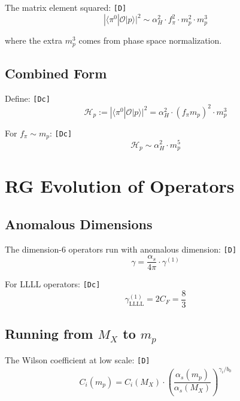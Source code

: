 \documentclass[11pt,a4paper]{article}
\newcommand{\tagD}{\textcolor{green!50!black}{\texttt{[D]}}}
\newcommand{\tagDc}{\textcolor{blue!70!black}{\texttt{[Dc]}}}
\theoremstyle{definition}
\begin{document}
The matrix element squared: \tagD{}
\begin{equation}
\label{eq:me-squared}
|\langle \pi^0 | \mathcal{O} | p \rangle|^2 \sim \alpha_H^2 \cdot f_\pi^2 \cdot m_p^2 \cdot m_p^3
\end{equation}

where the extra $m_p^3$ comes from phase space normalization.

\subsection{Combined Form}
\label{app:combined-hadronic}

Define: \tagDc{}
\begin{equation}
\label{eq:hp-combined}
\mathcal{H}_p := |\langle \pi^0 | \mathcal{O} | p \rangle|^2 = \alpha_H^2 \cdot (f_\pi m_p)^2 \cdot m_p^3
\end{equation}

For $f_\pi \sim m_p$: \tagDc{}
\begin{equation}
\label{eq:hp-scaling}
\mathcal{H}_p \sim \alpha_H^2 \cdot m_p^5
\end{equation}

\section{RG Evolution of Operators}
\label{app:rg}

\subsection{Anomalous Dimensions}
\label{app:anomalous}

The dimension-6 operators run with anomalous dimension: \tagD{}
\begin{equation}
\label{eq:anomalous-dim}
\gamma = \frac{\alpha_s}{4\pi} \cdot \gamma^{(1)}
\end{equation}

For LLLL operators: \tagDc{}
\begin{equation}
\label{eq:gamma-llll}
\gamma^{(1)}_{\text{LLLL}} = 2 C_F = \frac{8}{3}
\end{equation}

\subsection{Running from $M_X$ to $m_p$}
\label{app:running}

The Wilson coefficient at low scale: \tagD{}
\begin{equation}
\label{eq:wilson-running}
C_i(m_p) = C_i(M_X) \cdot \left(\frac{\alpha_s(m_p)}{\alpha_s(M_X)}\right)^{\gamma_i/b_0}
\end{equation}
\end{document}
